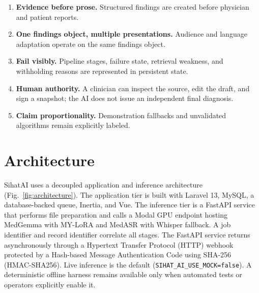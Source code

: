 \documentclass[conference]{IEEEtran}
\begin{document}
\begin{enumerate}
    \item \textbf{Evidence before prose.} Structured findings are created before physician and patient reports.
    \item \textbf{One findings object, multiple presentations.} Audience and language adaptation operate on the same findings object.
    \item \textbf{Fail visibly.} Pipeline stages, failure state, retrieval weakness, and withholding reasons are represented in persistent state.
    \item \textbf{Human authority.} A clinician can inspect the source, edit the draft, and sign a snapshot; the AI does not issue an independent final diagnosis.
    \item \textbf{Claim proportionality.} Demonstration fallbacks and unvalidated algorithms remain explicitly labeled.
\end{enumerate}

\section{Architecture}

SihatAI uses a decoupled application and inference architecture (Fig.~\ref{fig:architecture}). The application tier is built with Laravel 13, MySQL, a database-backed queue, Inertia, and Vue. The inference tier is a FastAPI service that performs file preparation and calls a Modal GPU endpoint hosting MedGemma with MY-LoRA and MedASR with Whisper fallback. A job identifier and record identifier correlate all stages. The FastAPI service returns asynchronously through a Hypertext Transfer Protocol (HTTP) webhook protected by a Hash-based Message Authentication Code using SHA-256 (HMAC-SHA256). Live inference is the default (\texttt{SIHAT\_AI\_USE\_MOCK=false}). A deterministic offline harness remains available only when automated tests or operators explicitly enable it.
\end{document}
